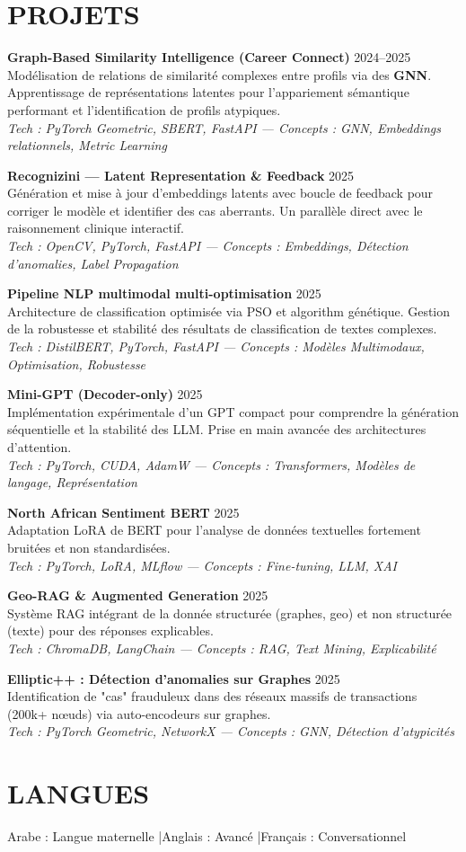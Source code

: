 \documentclass[a4paper,12pt]{article}
\begin{document}
\section{PROJETS}
\setlength{\parskip}{6pt}
{\small

\textbf{Graph-Based Similarity Intelligence (Career Connect)} \hfill 2024--2025 \\
Modélisation de relations de similarité complexes entre profils via des \textbf{GNN}. Apprentissage de représentations latentes pour l'appariement sémantique performant et l'identification de profils atypiques. \\
\textit{Tech : PyTorch Geometric, SBERT, FastAPI — Concepts : GNN, Embeddings relationnels, Metric Learning}

\textbf{Recognizini — Latent Representation \& Feedback} \hfill 2025 \\
Génération et mise à jour d'embeddings latents avec boucle de feedback pour corriger le modèle et identifier des cas aberrants. Un parallèle direct avec le raisonnement clinique interactif. \\
\textit{Tech : OpenCV, PyTorch, FastAPI — Concepts : Embeddings, Détection d'anomalies, Label Propagation}

\textbf{Pipeline NLP multimodal multi-optimisation} \hfill 2025 \\
Architecture de classification optimisée via PSO et algorithm génétique. Gestion de la robustesse et stabilité des résultats de classification de textes complexes. \\
\textit{Tech : DistilBERT, PyTorch, FastAPI — Concepts : Modèles Multimodaux, Optimisation, Robustesse}

\textbf{Mini-GPT (Decoder-only)} \hfill 2025 \\
Implémentation expérimentale d’un GPT compact pour comprendre la génération séquentielle et la stabilité des LLM. Prise en main avancée des architectures d'attention. \\
\textit{Tech : PyTorch, CUDA, AdamW — Concepts : Transformers, Modèles de langage, Représentation}

\textbf{North African Sentiment BERT} \hfill 2025 \\
Adaptation LoRA de BERT pour l’analyse de données textuelles fortement bruitées et non standardisées. \\
\textit{Tech : PyTorch, LoRA, MLflow — Concepts : Fine-tuning, LLM, XAI}

\textbf{Geo-RAG \& Augmented Generation} \hfill 2025 \\
Système RAG intégrant de la donnée structurée (graphes, geo) et non structurée (texte) pour des réponses explicables. \\
\textit{Tech : ChromaDB, LangChain — Concepts : RAG, Text Mining, Explicabilité}

\textbf{Elliptic++ : Détection d'anomalies sur Graphes} \hfill 2025 \\
Identification de "cas" frauduleux dans des réseaux massifs de transactions (200k+ nœuds) via auto-encodeurs sur graphes. \\
\textit{Tech : PyTorch Geometric, NetworkX — Concepts : GNN, Détection d'atypicités}
}



\section{LANGUES}
Arabe : Langue maternelle \quad|\quad Anglais : Avancé \quad|\quad Français : Conversationnel
\end{document}
